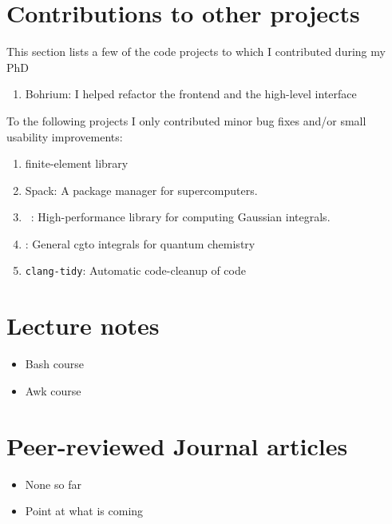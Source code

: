 \section*{Contributions to other projects}
This section lists a few of the code projects to which I contributed
during my PhD

\begin{enumerate}
	\item Bohrium: I helped refactor the \cpp frontend and the high-level
		\cpp interface
\end{enumerate}
%
To the following projects I only contributed minor bug fixes and/or small
usability improvements:
\begin{enumerate}
	\addtocounter{enumi}{1}
	\item \dealii{} finite-element library
	\item Spack: A package manager for supercomputers.
	\item \libint~\cite{Libint2,Libint2_231}:
		High-performance library for computing Gaussian integrals.
	\item \libcint{}: General cgto integrals for quantum chemistry
	\item \texttt{clang-tidy}: Automatic code-cleanup of \cpp code
\end{enumerate}

\section*{Lecture notes}
\begin{itemize}
	\item Bash course\cite{BashCourse2015}
	\item Awk course\cite{AwkCourse2016}
\end{itemize}

\section*{Peer-reviewed Journal articles}
\begin{itemize}
	\item None so far
	\item Point at what is coming
\end{itemize}
